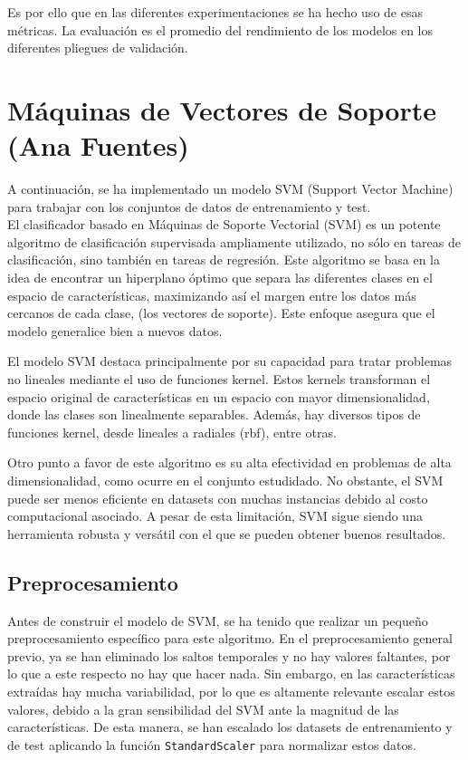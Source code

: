 \documentclass[12pt,letterpaper]{article}
\begin{document}
Es por ello que en las diferentes experimentaciones se ha hecho uso de esas métricas. La evaluación es el promedio del rendimiento de los modelos en los diferentes pliegues de validación. 

\section{Máquinas de Vectores de Soporte (Ana Fuentes)}
A continuación, se ha implementado un modelo SVM (Support Vector Machine) para trabajar con los conjuntos de datos de entrenamiento y test. \\

El clasificador basado en Máquinas de Soporte Vectorial (SVM) es un potente algoritmo de clasificación supervisada ampliamente utilizado, no sólo en tareas de clasificación, sino también en tareas de regresión. Este algoritmo se basa en la idea de encontrar un hiperplano óptimo que separa las diferentes clases en el espacio de características, maximizando así el margen entre los datos más cercanos de cada clase, (los vectores de soporte). Este enfoque asegura que el modelo generalice bien a nuevos datos.

El modelo SVM destaca principalmente por su capacidad para tratar problemas no lineales mediante el uso de funciones kernel. Estos kernels transforman el espacio original de características en un espacio con mayor dimensionalidad, donde las clases son linealmente separables. Además, hay diversos tipos de funciones kernel, desde lineales a radiales (rbf), entre otras. 

Otro punto a favor de este algoritmo es su alta efectividad en problemas de alta dimensionalidad, como ocurre en el conjunto estudidado. No obstante, el SVM puede ser menos eficiente en datasets con muchas instancias debido al costo computacional asociado. A pesar de esta limitación, SVM sigue siendo una herramienta robusta y versátil con el que se pueden obtener buenos resultados.

\subsection{Preprocesamiento}
Antes de construir el modelo de SVM, se ha tenido que realizar un pequeño preprocesamiento específico para este algoritmo. En el preprocesamiento general previo, ya se han eliminado los saltos temporales y no hay valores faltantes, por lo que a este respecto no hay que hacer nada. Sin embargo, en las características extraídas hay mucha variabilidad, por lo que es altamente relevante escalar estos valores, debido a la gran sensibilidad del SVM ante la magnitud de las características. De esta manera, se han escalado los datasets de entrenamiento y de test aplicando la función \texttt{StandardScaler} para normalizar estos datos.
\end{document}
